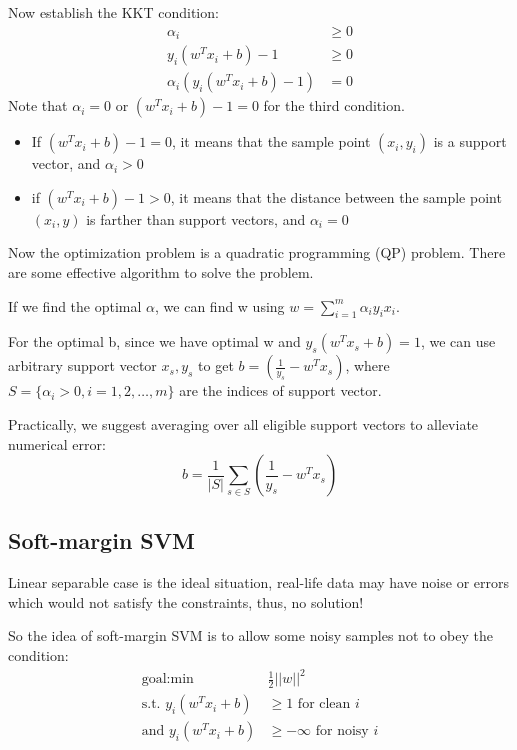 \documentclass[letterpaper,12pt]{article}
\begin{document}
Now establish the KKT condition:
\begin{align*}
    \alpha_i                     & \ge 0 \\
    y_i(w^T x_i +b)-1            & \ge 0 \\
    \alpha_i (y_i(w^T x_i +b)-1) & =0
\end{align*}
Note that $\alpha_i = 0$ or $(w^T x_i +b)-1 = 0$ for the third condition.
\begin{itemize}
    \item If $(w^T x_i +b)-1 = 0$, it means that the sample point $(x_i,y_i)$ is a
          support vector, and $\alpha_i>0$
    \item if $(w^T x_i +b)-1 > 0$, it means that the distance between the sample point
          $(x_i,y)$ is farther than support vectors, and $\alpha_i = 0$
\end{itemize}

Now the optimization problem is a quadratic programming (QP) problem. There are
some effective algorithm to solve the problem.

If we find the optimal $\alpha$, we can find w using $w =
    \sum_{i=1}^{m}\alpha_i y_i x_i$.

For the optimal b, since we have optimal w and $y_s(w^T x_s+b)=1$, we can use
arbitrary support vector $x_s,y_s$ to get $b=(\frac{1}{y_s}-w^T x_s)$, where
$S=\{ \alpha_i>0, i = 1,2,\ldots,m\}$ are the indices of support vector.

Practically, we suggest averaging over all eligible support vectors to
alleviate numerical error:
\[
    b = \frac{1}{|S|}\sum_{s\in S}    (\frac{1}{y_s}-w^T x_s)
\]

\subsection{Soft-margin SVM}

Linear separable case is the ideal situation, real-life data may have noise or
errors which would not satisfy the constraints, thus, no solution!

So the idea of soft-margin SVM is to allow some noisy samples not to obey the
condition:
\begin{align*}
    \text{goal:}  \min            & \frac{1}{2}||w||^2               \\
    \text{s.t. }y_i(w^T x_i + b)  & \ge 1 \text{ for clean } i       \\
    \text{and }  y_i(w^T x_i + b) & \ge -\infty \text{ for noisy } i
\end{align*}
\end{document}
